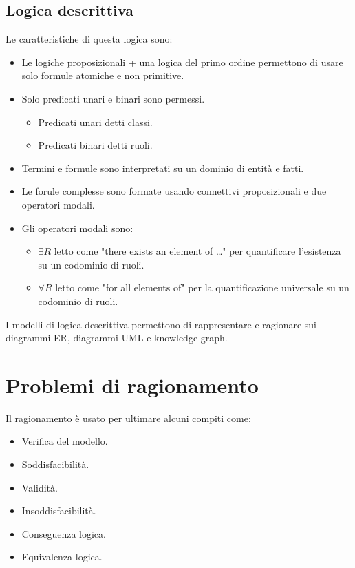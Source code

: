 \documentclass[../main.tex]{subfiles}
\begin{document}
    \subsection{Logica descrittiva}
    Le caratteristiche di questa logica sono:
    \begin{itemize}
        \item Le logiche proposizionali + una logica del primo ordine permettono di usare solo formule atomiche e non primitive.
        \item Solo predicati unari e binari sono permessi.
        \begin{itemize}
            \item Predicati unari detti classi.
            \item Predicati binari detti ruoli.
        \end{itemize}
        \item Termini e formule sono interpretati su un dominio di entità e fatti.
        \item Le forule complesse sono formate usando connettivi proposizionali e due operatori modali.
        \item Gli operatori modali sono:
        \begin{itemize}
            \item $\exists R$ letto come "there exists an element of \dots" per quantificare l'esistenza su un codominio di ruoli.
            \item $\forall R$ letto come "for all elements of" per la quantificazione universale su un codominio di ruoli.
        \end{itemize}
    \end{itemize}
    I modelli di logica descrittiva permettono di rappresentare e ragionare sui diagrammi ER, diagrammi UML e knowledge graph.

    \section{Problemi di ragionamento}
    Il ragionamento è usato per ultimare alcuni compiti come:
    \begin{itemize}
        \item Verifica del modello.
        \item Soddisfacibilità.
        \item Validità.
        \item Insoddisfacibilità.
        \item Conseguenza logica.
        \item Equivalenza logica.
    \end{itemize}
\end{document}
